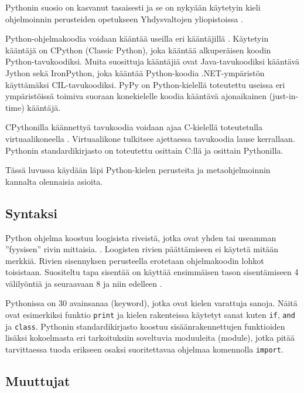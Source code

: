 \documentclass[finnish]{tktltiki2}
\theoremstyle{definition}
\theoremstyle{remark}
\begin{document}
Pythonin suosio on kasvanut tasaisesti ja se on nykyään käytetyin kieli ohjelmoinnin perusteiden opetukseen Yhdysvaltojen yliopistoissa \cite{python-teaching}.

Python-ohjelmakoodia voidaan kääntää useilla eri kääntäjillä \cite{martelli2006python}. Käytetyin kääntäjä on CPython (Classic Python), joka kääntää alkuperäisen koodin Python-tavukoodiksi. Muita suosittuja kääntäjiä ovat Java-tavukoodiksi kääntävä Jython sekä IronPython, joka kääntää Python-koodia .NET-ympäristön käyttämäksi CIL-tavukoodiksi. PyPy on Python-kielellä toteutettu useissa eri ympäristöissä toimiva suoraan konekielelle koodia kääntävä ajonaikainen (just-in-time) kääntäjä. %

CPythonilla käännettyä tavukoodia voidaan ajaa C-kielellä toteutetulla virtuaalikoneella \cite{martelli2006python}. Virtuaalikone tulkitsee ajettaessa tavukoodia lause kerrallaan. Pythonin standardikirjasto on toteutettu osittain C:llä ja osittain Pythonilla.

Tässä luvussa käydään läpi Python-kielen perusteita ja metaohjelmoinnin kannalta olennaisia asioita.


\subsection{Syntaksi}

Python ohjelma koostuu loogisista riveistä, jotka ovat yhden tai useamman ''fyysisen'' rivin mittaisia. \cite{martelli2006python}. Loogisten rivien päättämiseen ei käytetä mitään merkkiä. Rivien sisennyksen perusteella erotetaan ohjelmakoodin lohkot toisistaan. Suositeltu tapa sisentää on käyttää ensimmäisen tason sisentämiseen 4 välilyöntiä ja seuraavaan 8 ja niin edelleen \cite{pep8}. 

Pythonissa on 30 avainsanaa (keyword), jotka ovat kielen varattuja sanoja. Näitä ovat esimerkiksi funktio \verb|print| ja kielen rakenteissa käytetyt sanat kuten \verb|if|, \verb|and| ja \verb|class|. Pythonin standardikirjasto koostuu sisäänrakennettujen funktioiden lisäksi kokoelmasta eri tarkoituksiin soveltuvia moduuleita (module), jotka pitää tarvittaessa tuoda erikseen osaksi suoritettavaa ohjelmaa komennolla \verb|import|.

\subsection{Muuttujat}
\end{document}
